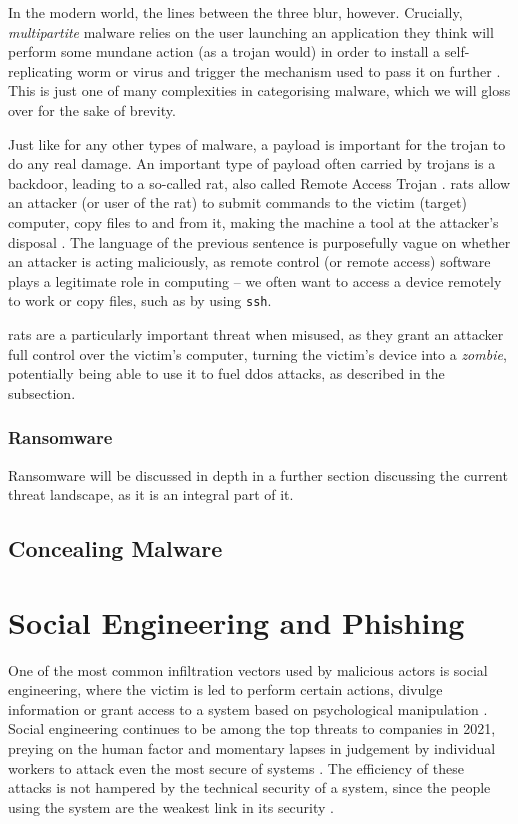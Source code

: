 In the modern world, the lines between the three blur, however. Crucially, \emph{multipartite} malware relies on the
user launching an application they think will perform some mundane action (as a trojan would) in order to install a
self-replicating worm or virus and trigger the mechanism used to pass it on further \cite{viruses-revealed-book}. This
is just one of many complexities in categorising malware, which we will gloss over for the sake of brevity.

Just like for any other types of malware, a payload is important for the trojan to do any real damage. An important type
of payload often carried by trojans is a backdoor, leading to a so-called \acrfull{rat}, also called Remote Access Trojan 
\cite{viruses-revealed-book}. \acrshort{rat}s allow an attacker (or user of the \acrshort{rat}) to submit commands to
the victim (target) computer, copy files to and from it, making the machine a tool at the attacker's disposal
\cite{viruses-revealed-book}. The language of the previous sentence is purposefully vague on whether an attacker
is acting maliciously, as remote control (or remote access) software plays a legitimate role in computing -- we often
want to access a device remotely to work or copy files, such as by using \verb+ssh+.

\acrshort{rat}s are a particularly important threat when misused, as they grant an attacker full control over the
victim's computer, turning the victim's device into a \emph{zombie}, potentially being able to use it to fuel
\acrshort{ddos} attacks, as described in the  subsection.


\subsubsection{Ransomware}
Ransomware will be discussed in depth in a further section discussing the current threat landscape, as it is an integral
part of it.

\subsection{Concealing Malware}

\section{Social Engineering and Phishing}
One of the most common infiltration vectors used by malicious actors is social engineering, 
where the victim is led to perform certain actions, divulge information or grant access to a 
system based on psychological manipulation \cite{advanced-social-engineering-attacks, covid19-social-engineering}. 
Social engineering continues to be among the top threats to companies in 2021, preying on the human
factor and momentary lapses in judgement by individual workers to attack even the most secure of systems
\cite{verizon_2021}. 
The efficiency of these attacks is not hampered by the technical security of a system,
since the people using the system are the weakest link in its security \cite{advanced-social-engineering-attacks,
social-engineering-attacks}.


